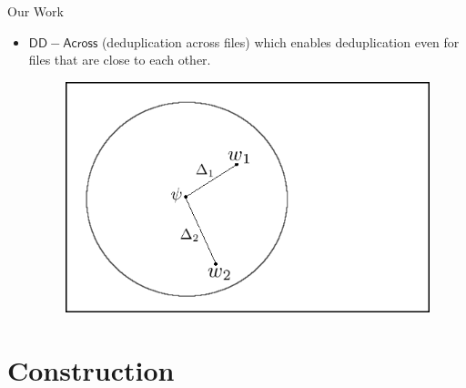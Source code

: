 \documentclass{beamer}
\newcommand{\scheme}{\mathsf{DD-Across}}
\begin{document}
\begin{frame}{Our Work}
	\begin{itemize}
		\setlength\itemsep{1em}
		\item $\scheme$ (deduplication across files) which enables deduplication even for files that are close to
	each other.
	    \begin{figure}[H]
	\includegraphics[scale=0.35]{example.png}
	\label{fig:example}
	\end{figure}
	\end{itemize}
\end{frame}


\section{Construction}
\end{document}
